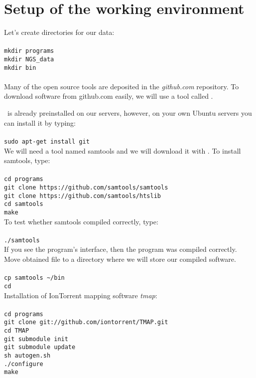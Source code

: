 \section{Setup of the working environment}
Let's create directories for our data:\\~\\
\texttt{mkdir programs \\
mkdir NGS\_data \\
mkdir bin}\\~\\

Many of the open source tools are deposited in the \textit{github.com} repository.
To download software from github.com easily, we will use a tool called \git.

\Git~is already preinstalled on our servers, however, on your own Ubuntu servers
you can install it by typing:\\~\\
\texttt{sudo apt-get install git}\\

We will need a tool named samtools and we will download it with \git.
To install samtools, type:\\~\\
\texttt{cd programs}\\
\texttt{git clone https://github.com/samtools/samtools}\\
\texttt{git clone https://github.com/samtools/htslib}\\
\texttt{cd samtools}\\
\texttt{make}\\

To test whether samtools compiled correctly, type:\\~\\
\texttt{./samtools}\\

If you see the program's interface, then the program was compiled correctly.
Move obtained file to a directory where we will store our compiled software.\\~\\
\texttt{cp samtools \textasciitilde/bin\\
cd}\\

Installation of IonTorrent mapping software \textit{tmap}:\\~\\
\texttt{cd programs}\\
\texttt{git clone git://github.com/iontorrent/TMAP.git}\\
\texttt{cd TMAP}\\
\texttt{git submodule init}\\
\texttt{git submodule update}\\
\texttt{sh autogen.sh}\\
\texttt{./configure}\\
\texttt{make}






